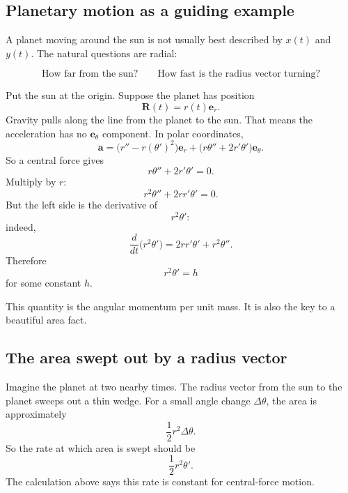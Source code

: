 \subsection{Planetary motion as a guiding example}

A planet moving around the sun is not usually best described by \(x(t)\) and \(y(t)\).
The natural questions are radial:

\[
    \text{How far from the sun?}
    \qquad
    \text{How fast is the radius vector turning?}
\]

Put the sun at the origin.  Suppose the planet has position
\[
    \mathbf R(t)=r(t)\mathbf e_r.
\]
Gravity pulls along the line from the planet to the sun.  That means the acceleration
has no \(\mathbf e_\theta\) component.  In polar coordinates,
\[
    \mathbf a
    =
    \bigl(r''-r(\theta')^2\bigr)\mathbf e_r
    +
    \bigl(r\theta''+2r'\theta'\bigr)\mathbf e_\theta.
\]
So a central force gives
\[
    r\theta''+2r'\theta'=0.
\]
Multiply by \(r\):
\[
    r^2\theta''+2rr'\theta'=0.
\]
But the left side is the derivative of
\[
    r^2\theta':
\]
indeed,
\[
    \frac{d}{dt}\bigl(r^2\theta'\bigr)
    =
    2rr'\theta'+r^2\theta''.
\]
Therefore
\[
\boxed{
    r^2\theta'=h
}
\]
for some constant \(h\).

This quantity is the angular momentum per unit mass.  It is also the key to a beautiful
area fact.

\subsection{The area swept out by a radius vector}

Imagine the planet at two nearby times.  The radius vector from the sun to the planet
sweeps out a thin wedge.  For a small angle change \(\Delta\theta\), the area is
approximately
\[
    \frac12 r^2\Delta\theta.
\]
So the rate at which area is swept should be
\[
    \frac12 r^2\theta'.
\]
The calculation above says this rate is constant for central-force motion.

